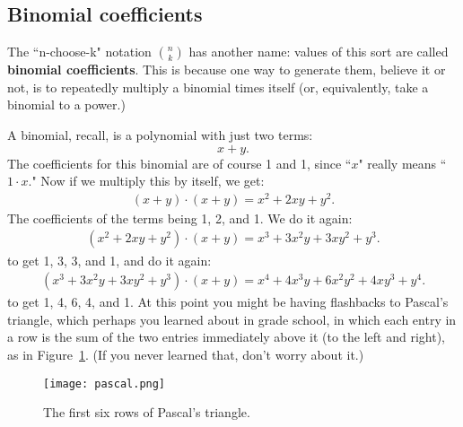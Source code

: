 \subsection{Binomial coefficients}

The ``n-choose-k" notation $\binom{n}{k}$ has another name: values of this
sort are called \textbf{binomial coefficients}. This is because one way to
generate them, believe it or not, is to repeatedly multiply a binomial
times itself (or, equivalently, take a binomial to a power.)

A binomial, recall, is a polynomial with just two terms:
\[
x+y.
\]
The coefficients for this binomial are of course 1 and 1, since ``$x$"
really means ``$1\cdot x$." Now if we multiply this by itself, we get:
\begin{align*}
(x+y)\cdot(x+y) = x^2 + 2xy + y^2.
\end{align*}
The coefficients of the terms being 1, 2, and 1. We do it again:
\begin{align*}
(x^2+2xy+y^2)\cdot(x+y) = x^3 + 3x^2y + 3xy^2 + y^3.
\end{align*}
to get 1, 3, 3, and 1, and do it again:
\begin{align*}
(x^3+3x^2y+3xy^2+y^3)\cdot(x+y) = x^4 + 4x^3y + 6x^2y^2 + 4xy^3 + y^4.
\end{align*}
to get 1, 4, 6, 4, and 1. At this point you might be having flashbacks to
Pascal's triangle, which perhaps you learned about in grade school, in
which each entry in a row is the sum of the two entries immediately above
it (to the left and right), as in Figure~\ref{pascal}. (If you never
learned that, don't worry about it.)

\begin{figure}[ht]
\centering
\texttt{[image: pascal.png]}
\caption{The first six rows of Pascal's triangle.}
\label{pascal}
\end{figure}

